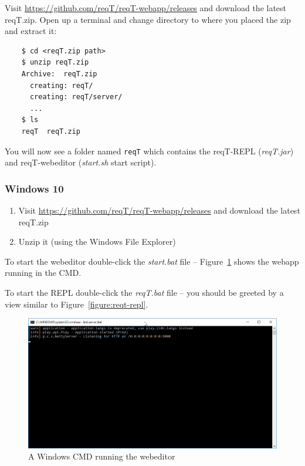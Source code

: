\documentclass[11pt]{article}
\begin{document}
\begin{framed}
\noindent Visit \url{https://github.com/reqT/reqT-webapp/releases} and download the latest reqT.zip. Open up a terminal and change directory to where you placed the zip and extract it:
{\footnotesize\begin{verbatim}
    $ cd <reqT.zip path>
    $ unzip reqT.zip
    Archive:  reqT.zip
      creating: reqT/
      creating: reqT/server/
      ...
    $ ls
    reqT  reqT.zip
\end{verbatim}}
\noindent You will now see a folder named \texttt{reqT} which contains the reqT-REPL (\textit{reqT.jar}) and reqT-webeditor (\textit{start.sh} start script).
\end{framed}

\subsubsection{Windows 10}\label{section:preparations:installation:windows}

\begin{enumerate}
\item Visit \url{https://github.com/reqT/reqT-webapp/releases} and download the latest reqT.zip
\item Unzip it (using the Windows File Explorer)
\end{enumerate}

To start the webeditor double-click the \textit{start.bat} file -- Figure~\ref{figure:cmd-running-webapp} shows the webapp running in the CMD.


To start the REPL double-click the \textit{reqT.bat} file -- you should be greeted by a view similar to Figure~\ref{figure:reqt-repl}.

\begin{figure}[H]
  \centering
    \includegraphics[width=\textwidth]{cmd_running_webapp.png}
  \caption{A Windows CMD running the webeditor}
  \label{figure:cmd-running-webapp}
\end{figure}
\end{document}
